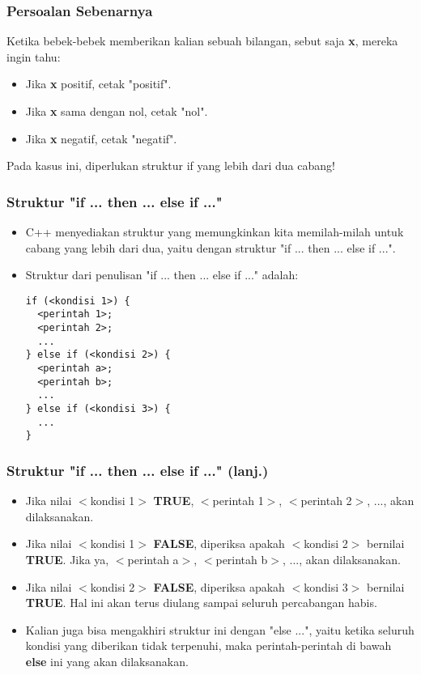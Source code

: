 \begin{frame}
\frametitle{Persoalan Sebenarnya}
Ketika bebek-bebek memberikan kalian sebuah bilangan, sebut saja \textbf{x}, mereka ingin tahu:
\begin{itemize}
  \item Jika \textbf{x} positif, cetak "positif".
  \item Jika \textbf{x} sama dengan nol, cetak "nol".
  \item Jika \textbf{x} negatif, cetak "negatif".
\end{itemize}

Pada kasus ini, diperlukan struktur if yang lebih dari dua cabang!
\end{frame}

\begin{frame}[fragile]
\frametitle{Struktur "if ... then ... else if ..."}
\begin{itemize}
  \item C++ menyediakan struktur yang memungkinkan kita memilah-milah untuk cabang yang lebih dari dua, yaitu dengan struktur "if ... then ... else if ...".
  \item Struktur dari penulisan "if ... then ... else if ..." adalah:
\begin{lstlisting}
if (<kondisi 1>) {
  <perintah 1>;
  <perintah 2>;
  ...
} else if (<kondisi 2>) {
  <perintah a>;
  <perintah b>;
  ...
} else if (<kondisi 3>) {
  ...
}
\end{lstlisting}

\end{itemize}
\end{frame}

\begin{frame}
\frametitle{Struktur "if ... then ... else if ..." (lanj.)}
\begin{itemize}
  \item Jika nilai $<$kondisi 1$>$ \textbf{TRUE}, $<$perintah 1$>$, $<$perintah 2$>$, ..., akan dilaksanakan.
  \item Jika nilai $<$kondisi 1$>$ \textbf{FALSE}, diperiksa apakah $<$kondisi 2$>$ bernilai \textbf{TRUE}. Jika ya, $<$perintah a$>$, $<$perintah b$>$, ..., akan dilaksanakan.
  \item Jika nilai $<$kondisi 2$>$ \textbf{FALSE}, diperiksa apakah $<$kondisi 3$>$ bernilai \textbf{TRUE}. Hal ini akan terus diulang sampai seluruh percabangan habis.
  \item Kalian juga bisa mengakhiri struktur ini dengan "else ...", yaitu ketika seluruh kondisi yang diberikan tidak terpenuhi, maka perintah-perintah di bawah \textbf{else} ini yang akan dilaksanakan.
\end{itemize}
\end{frame}

